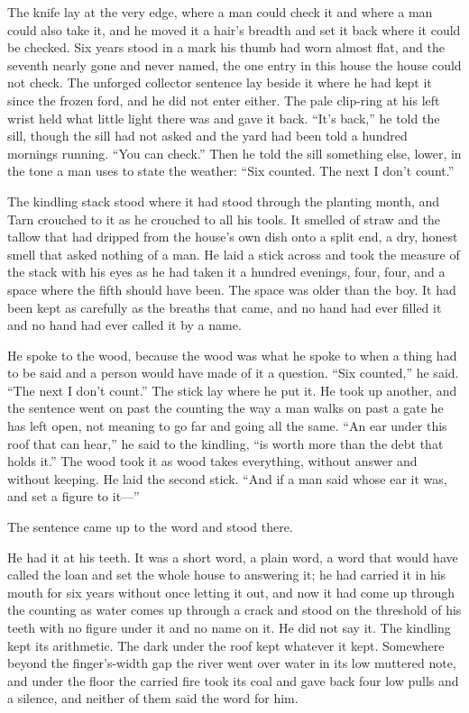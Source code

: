 The knife lay at the very edge, where a man could check it and where a man could also take it, and he moved it a hair's breadth and set it back where it could be checked. Six years stood in a mark his thumb had worn almost flat, and the seventh nearly gone and never named, the one entry in this house the house could not check. The unforged collector sentence lay beside it where he had kept it since the frozen ford, and he did not enter either. The pale clip-ring at his left wrist held what little light there was and gave it back. “It's back,” he told the sill, though the sill had not asked and the yard had been told a hundred mornings running. “You can check.” Then he told the sill something else, lower, in the tone a man uses to state the weather: “Six counted. The next I don't count.”

\scenebreak

The kindling stack stood where it had stood through the planting month, and Tarn crouched to it as he crouched to all his tools. It smelled of straw and the tallow that had dripped from the house's own dish onto a split end, a dry, honest smell that asked nothing of a man. He laid a stick across and took the measure of the stack with his eyes as he had taken it a hundred evenings, four, four, and a space where the fifth should have been. The space was older than the boy. It had been kept as carefully as the breaths that came, and no hand had ever filled it and no hand had ever called it by a name.

He spoke to the wood, because the wood was what he spoke to when a thing had to be said and a person would have made of it a question. “Six counted,” he said. “The next I don't count.” The stick lay where he put it. He took up another, and the sentence went on past the counting the way a man walks on past a gate he has left open, not meaning to go far and going all the same. “An ear under this roof that can hear,” he said to the kindling, “is worth more than the debt that holds it.” The wood took it as wood takes everything, without answer and without keeping. He laid the second stick. “And if a man said whose ear it was, and set a figure to it—”

The sentence came up to the word and stood there.

He had it at his teeth. It was a short word, a plain word, a word that would have called the loan and set the whole house to answering it; he had carried it in his mouth for six years without once letting it out, and now it had come up through the counting as water comes up through a crack and stood on the threshold of his teeth with no figure under it and no name on it. He did not say it. The kindling kept its arithmetic. The dark under the roof kept whatever it kept. Somewhere beyond the finger's-width gap the river went over water in its low muttered note, and under the floor the carried fire took its coal and gave back four low pulls and a silence, and neither of them said the word for him.

